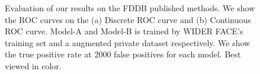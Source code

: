 \documentclass{article} %
\begin{document}
\begin{figure}
  \centering


  \caption{Evaluation of our results on the FDDB published methods. We show the ROC curves on the (a) Discrete ROC curve and (b) Continuous ROC curve.
Model-A and Model-B is trained by WIDER FACE's training set and a augmented private dataset respectively. We show the true positive rate at 2000 false positives for each model. Best viewed in color.}\label{4}
\end{figure}
\end{document}
